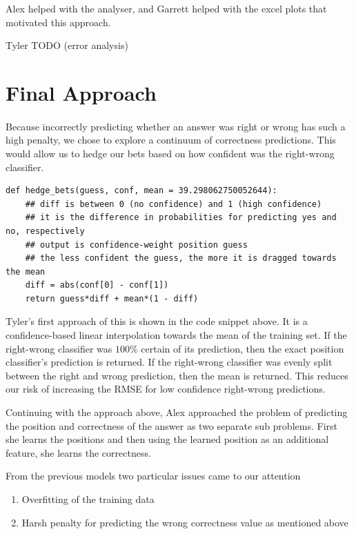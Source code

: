 \documentclass[letterpaper]{article}
\begin{document}
Alex helped with the analyser, and Garrett helped with the excel plots that motivated this approach.

Tyler TODO (error analysis)

\section{Final Approach}

\paragraph{} Because incorrectly predicting whether an answer was right or wrong has such a high penalty, we chose to explore a continuum of correctness predictions. This would allow us to hedge our bets based on how confident was the right-wrong classifier.

\begin{verbatim}
def hedge_bets(guess, conf, mean = 39.298062750052644):
    ## diff is between 0 (no confidence) and 1 (high confidence)
    ## it is the difference in probabilities for predicting yes and no, respectively
    ## output is confidence-weight position guess
    ## the less confident the guess, the more it is dragged towards the mean
    diff = abs(conf[0] - conf[1]) 
    return guess*diff + mean*(1 - diff)
\end{verbatim}

Tyler's first approach of this is shown in the code snippet above. It is a confidence-based linear interpolation towards the mean of the training set. If the right-wrong classifier was $100\%$ certain of its prediction, then the exact position classifier's prediction is returned. If the right-wrong classifier was evenly split between the right and wrong prediction, then the mean is returned. This reduces our risk of increasing the RMSE for low confidence right-wrong predictions.

Continuing with the approach above, Alex approached the problem of predicting the position and correctness of the answer as two separate sub problems.  First she learns the positions and then using the learned position as an additional feature, she learns the correctness.  

From the previous models two particular issues came to our attention
\begin{enumerate}
\item Overfitting of the training data
\item Harsh penalty for predicting the wrong correctness value as mentioned above
\end{enumerate}
\end{document}

